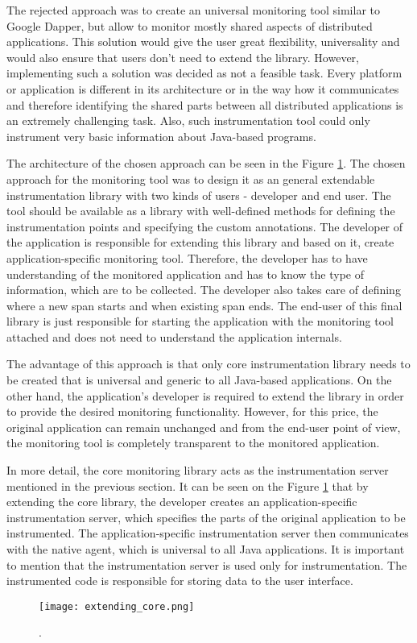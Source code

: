 The rejected approach was to create an universal monitoring tool similar to Google Dapper, but allow to monitor mostly shared aspects of distributed applications. This solution would give the user great flexibility, universality and would also ensure that users don't need to extend the library. However, implementing such a solution was decided as not a feasible task. Every platform or application is different in its architecture or in the way how it communicates and therefore identifying the shared parts between all distributed applications is an extremely challenging task. Also, such instrumentation tool could only instrument very basic information about Java-based programs.

The architecture of the chosen approach can be seen in the Figure \ref{fig:extending_core}. The chosen approach for the monitoring tool was to design it as an general extendable instrumentation library with two kinds of users - developer and end user. The tool should be available as a library with well-defined methods for defining the instrumentation points and specifying the custom annotations. The developer of the application is responsible for extending this library and based on it, create application-specific monitoring tool. Therefore, the developer has to have understanding of the monitored application and has to know the type of information, which are to be collected. The developer also takes care of defining where a new span starts and when existing span ends. The end-user of this final library is just responsible for starting the application with the monitoring tool attached and does not need to understand the application internals.

The advantage of this approach is that only core instrumentation library needs to be created that is universal and generic to all Java-based applications. On the other hand, the application's developer is required to extend the library in order to provide the desired monitoring functionality. However, for this price, the original application can remain unchanged and from the end-user point of view, the monitoring tool is completely transparent to the monitored application.

In more detail, the core monitoring library acts as the instrumentation server mentioned in the previous section. It can be seen on the Figure \ref{fig:extending_core} that by extending the core library, the developer creates an application-specific instrumentation server, which specifies the parts of the original application to be instrumented. The application-specific instrumentation server then communicates with the native agent, which is universal to all Java applications. It is important to mention that the instrumentation server is used only for instrumentation. The instrumented code is responsible for storing data to the user interface.
\begin{figure}
	\centering
	\texttt{[image: extending\_core.png]}
	\caption{.}
	\label{fig:extending_core}
\end{figure}


